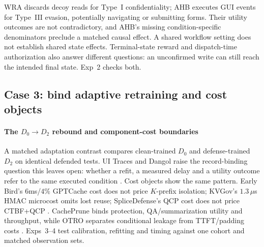WRA discards decoy reads for Type~I confidentiality; AHB executes GUI events for Type~III evasion, potentially navigating or submitting forms. Their utility outcomes are not contradictory, and AHB's missing condition-specific denominators preclude a matched causal effect. A shared workflow setting does not establish shared state effects. Terminal-state reward and dispatch-time authorization also answer different questions: an unconfirmed write can still reach the intended final state. Exp~2 checks both.

\subsection{Case 3: bind adaptive retraining and cost objects}
\paragraph{The $D_0\to D_2$ rebound and component-cost boundaries}
A matched adaptation contrast compares clean-trained $D_0$ and defense-trained $D_2$ on identical defended tests. UI Traces and Dangol raise the record-binding question this leaves open: whether a refit, a measured delay and a utility outcome refer to the same executed condition \cite{uitraces2026,dangol2026workflow}. Cost objects show the same pattern. Early Bird's $6$ms/$4\%$ GPTCache cost does not price $K$-prefix isolation; KVGov's $1.3\,\mu$s HMAC microcost omits lost reuse; SpliceDefense's QCP cost does not price CTBF+QCP \cite{earlybird2025,addagada2026kvgov,spliceleak2026}. CachePrune binds protection, QA/summarization utility and throughput, while OTRO separates conditional leakage from TTFT/padding costs \cite{wu2026cacheprune,lee2026otro}. Exps~3--4 test calibration, refitting and timing against one cohort and matched observation sets.
